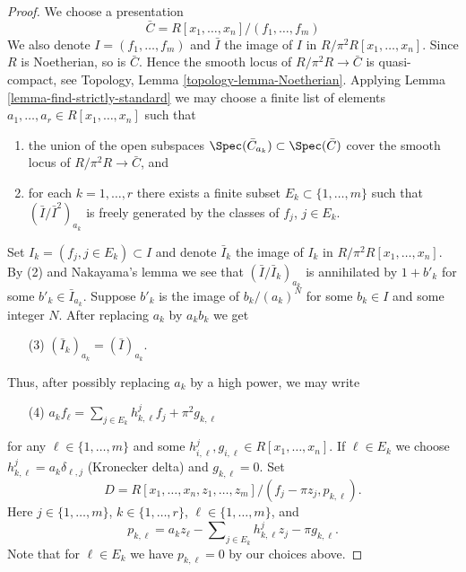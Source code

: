 \begin{proof}
We choose a presentation
$$
\bar C = R[x_1, \ldots, x_n]/(f_1, \ldots, f_m)
$$
We also denote $I = (f_1, \ldots, f_m)$ and $\bar I$ the image of
$I$ in $R/\pi^2R[x_1, \ldots, x_n]$. Since $R$ is Noetherian, so is
$\bar C$. Hence the smooth locus of $R/\pi^2 R \to \bar C$
is quasi-compact, see
Topology, Lemma \ref{topology-lemma-Noetherian}.
Applying
Lemma \ref{lemma-find-strictly-standard}
we may choose a finite list of elements
$a_1, \ldots, a_r \in R[x_1, \ldots, x_n]$ such that
\begin{enumerate}
\item the union of the open subspaces
$\Spec(\bar C_{a_k}) \subset \Spec(\bar C)$
cover the smooth locus of $R/\pi^2 R \to \bar C$, and
\item for each $k = 1, \ldots, r$ there exists a finite subset
$E_k \subset \{1, \ldots, m\}$ such that
$(\bar I/\bar I^2)_{a_k}$ is freely generated by the classes of
$f_j$, $j \in E_k$.
\end{enumerate}
Set $I_k = (f_j, j \in E_k) \subset I$ and denote $\bar I_k$ the
image of $I_k$ in $R/\pi^2R[x_1, \ldots, x_n]$.
By (2) and Nakayama's lemma we see that $(\bar I/\bar I_k)_{a_k}$
is annihilated by $1 + b'_k$ for some $b'_k \in \bar I_{a_k}$.
Suppose $b'_k$ is the image of $b_k/(a_k)^N$ for some $b_k \in I$
and some integer $N$. After replacing $a_k$ by $a_kb_k$ we get
\begin{enumerate}
\item[(3)] $(\bar I_k)_{a_k} = (\bar I)_{a_k}$.
\end{enumerate}
Thus, after possibly replacing $a_k$ by a high power, we may write
\begin{enumerate}
\item[(4)]
$a_k f_\ell = \sum\nolimits_{j \in E_k} h_{k, \ell}^jf_j + \pi^2 g_{k, \ell}$
\end{enumerate}
for any $\ell \in \{1, \ldots, m\}$ and some
$h_{i, \ell}^j, g_{i, \ell} \in R[x_1, \ldots, x_n]$.
If $\ell \in E_k$ we choose $h_{k, \ell}^j = a_k\delta_{\ell, j}$
(Kronecker delta) and $g_{k, \ell} = 0$. Set
$$
D = R[x_1, \ldots, x_n, z_1, \ldots, z_m]/
(f_j - \pi z_j, p_{k, \ell}).
$$
Here $j \in \{1, \ldots, m\}$, $k \in \{1, \ldots, r\}$,
$\ell \in \{1, \ldots, m\}$, and
$$
p_{k, \ell} = a_k z_\ell - \sum\nolimits_{j \in E_k} h_{k, \ell}^j z_j
- \pi g_{k, \ell}.
$$
Note that for $\ell \in E_k$ we have $p_{k, \ell} = 0$ by our choices above.


\end{proof}
